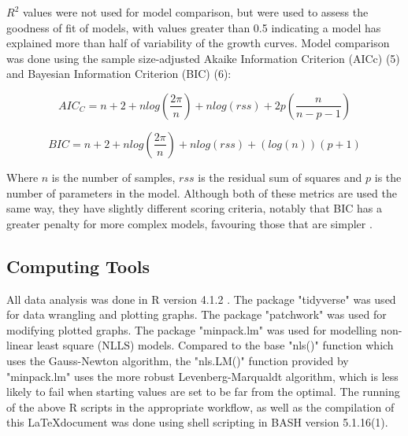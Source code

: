 \documentclass[11pt, letterpaper]{article}
\begin{document}
\noindent $R^2$ values were not used for model comparison, but were used to assess the goodness of fit of models, with values greater than 0.5 indicating a model has explained more than half of variability of the growth curves. Model comparison was done using the sample size-adjusted Akaike Information Criterion (AICc) (5) and Bayesian Information Criterion (BIC) (6):

\[
    AIC_C = n + 2 + nlog(\frac{2\pi}{n})+nlog(rss)+2p(\frac{n}{n-p-1}) \tag{5}
\]

\[
    BIC = n + 2 + nlog(\frac{2\pi}{n})+nlog(rss)+(log(n))(p+1) \tag{6}
\]

\noindent Where $n$ is the number of samples, $rss$ is the residual sum of squares and $p$ is the number of parameters in the model. Although both of these metrics are used the same way, they have slightly different scoring criteria, notably that BIC has a greater penalty for more complex models, favouring those that are simpler \citep{burnham&Anderson_2004}. 

\subsection{Computing Tools}
All data analysis was done in R version 4.1.2 \citep{R}. The package "tidyverse" \citep{tidyverse} was used for data wrangling and plotting graphs. The package "patchwork" \citep{patchwork} was used for modifying plotted graphs. The package "minpack.lm" \citep{minpack.lm} was used for modelling non-linear least square (NLLS) models. Compared to the base "nls()" function which uses the Gauss-Newton algorithm, the "nls.LM()" function provided by "minpack.lm" uses the more robust Levenberg-Marqualdt algorithm, which is less likely to fail when starting values are set to be far from the optimal. 
The running of the above R scripts in the appropriate workflow, as well as the compilation of this \LaTeX \space document was done using shell scripting in BASH version 5.1.16(1).
\end{document}
